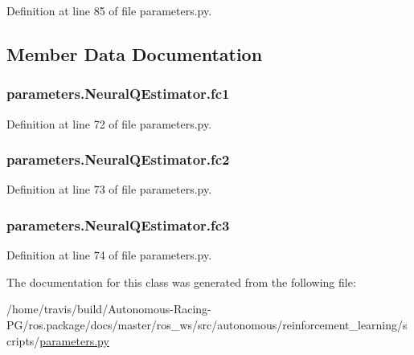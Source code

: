 Definition at line 85 of file parameters.\+py.



\subsection{Member Data Documentation}
\subsubsection[{\texorpdfstring{fc1}{fc1}}]{\setlength{\rightskip}{0pt plus 5cm}parameters.\+Neural\+Q\+Estimator.\+fc1}\hypertarget{classparameters_1_1_neural_q_estimator_ab0fb7d0e286565a2531f3ddb126e2592}{}\label{classparameters_1_1_neural_q_estimator_ab0fb7d0e286565a2531f3ddb126e2592}


Definition at line 72 of file parameters.\+py.

\subsubsection[{\texorpdfstring{fc2}{fc2}}]{\setlength{\rightskip}{0pt plus 5cm}parameters.\+Neural\+Q\+Estimator.\+fc2}\hypertarget{classparameters_1_1_neural_q_estimator_abd606711b39f423590adacb37c5b55d0}{}\label{classparameters_1_1_neural_q_estimator_abd606711b39f423590adacb37c5b55d0}


Definition at line 73 of file parameters.\+py.

\subsubsection[{\texorpdfstring{fc3}{fc3}}]{\setlength{\rightskip}{0pt plus 5cm}parameters.\+Neural\+Q\+Estimator.\+fc3}\hypertarget{classparameters_1_1_neural_q_estimator_ac48aa201a71a0e25e8ca7274a2cc5733}{}\label{classparameters_1_1_neural_q_estimator_ac48aa201a71a0e25e8ca7274a2cc5733}


Definition at line 74 of file parameters.\+py.



The documentation for this class was generated from the following file\+:\begin{DoxyCompactItemize}
\item 
/home/travis/build/\+Autonomous-\/\+Racing-\/\+P\+G/ros.\+package/docs/master/ros\+\_\+ws/src/autonomous/reinforcement\+\_\+learning/scripts/\hyperlink{parameters_8py}{parameters.\+py}\end{DoxyCompactItemize}
